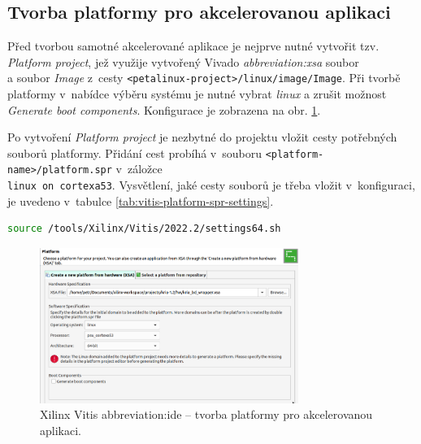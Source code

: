 \documentclass[a4paper, twoside, 11pt]{article}
\begin{document}
		\subsection{Tvorba platformy pro akcelerovanou aplikaci}
		Před tvorbou samotné akcelerované aplikace je nejprve nutné vytvořit tzv. \textit{Platform project}, jež využije vytvořený Vivado \textit{\gls{abbreviation:xsa}} soubor\\a soubor \textit{Image} z~cesty \texttt{<petalinux-project>/linux/image/Image}. Při tvorbě platformy v~nabídce výběru systému je nutné vybrat \textit{linux} a zrušit možnost \textit{Generate boot components}. Konfigurace je zobrazena na obr. \ref{fig:vitis-new-platform-linux}.\par
		Po vytvoření \textit{Platform project} je nezbytné do projektu vložit cesty potřebných souborů platformy. Přidání cest probíhá v~souboru \texttt{<platform-name>/platform.spr} v~záložce\\\texttt{linux on cortexa53}. Vysvětlení, jaké cesty souborů je třeba vložit v~konfiguraci, je uvedeno v~tabulce \ref{tab:vitis-platform-spr-settings}.\par
	

	\begin{lstlisting}[language={sh}, caption={Aktivace prostředí pro Vitis verze 2022.2.}, label= {lst:vitis-environment}, morekeywords={source}]
source /tools/Xilinx/Vitis/2022.2/settings64.sh\end{lstlisting}


		\begin{figure}[htbp!]
			\centering
			\includegraphics[width=0.75\textwidth]{src/png/vitis-new-platform-linux.png}
			\caption{Xilinx Vitis \gls{abbreviation:ide} – tvorba platformy pro akcelerovanou aplikaci.}
			\label{fig:vitis-new-platform-linux}
		\end{figure}
\end{document}
